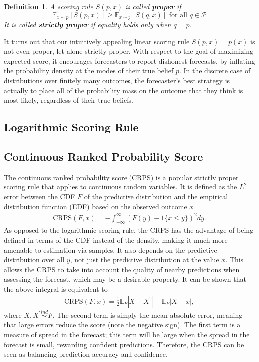 \documentclass[12pt]{article}
\newcommand*{\abs}[1]{\left\lvert#1\right\rvert}
\newcommand{\E}{\mathbb{E}}
\newtheorem{definition}{Definition}
\begin{document}
\begin{definition}
A scoring rule $S(p, x)$ is called \textbf{proper} if 
\[\E_{x \sim p}\left[S(p, x) \right] \geq \E_{x \sim p}\left[S(q, x) \right] \text{ for all } q  \in \mathcal{P}\]
It is called \textbf{strictly proper} if equality holds only when $q = p$. 
\end{definition}

It turns out that our intuitively appealing linear scoring rule $S(p, x) = p(x)$ is not even proper, let alone strictly proper. With respect to the goal of maximizing expected score, it encourages forecasters to report dishonest forecasts, 
by inflating the probability density at the modes of their true belief $p$. In the discrete case of distributions over finitely many outcomes, the forecaster's best strategy is actually to place all of the probability mass on the outcome that 
they think is most likely, regardless of their true beliefs. 

\subsection{Logarithmic Scoring Rule}

\subsection{Continuous Ranked Probability Score}
The continuous ranked probability score (CRPS) is a popular strictly proper scoring rule that applies to continuous random variables. It is defined as the $L^2$ error between the CDF $F$ of the predictive distribution and the 
empirical distribution function (EDF) based on the observed outcome $x$
\begin{align} 
\text{CRPS}(F, x) = -\int_{-\infty}^{\infty} \left(F(y) - 1\{x \leq y\} \right)^2 dy. \label{CRPS}
\end{align}
As opposed to the logarithmic scoring rule, the CRPS has the advantage of being defined in terms of the CDF instead of the density, making it much more amenable to estimation via samples. It also depends on the predictive 
distribution over all $y$, not just the predictive distribution at the value $x$. This allows the CRPS to take into account the quality of nearby predictions when assessing the forecast, which may be a desirable property. It can be 
shown that the above integral is equivalent to 
\begin{align}
\text{CRPS}(F, x) = \frac{1}{2} \E_F \abs{X - X^\prime} - \E_F \abs{X - x}, \label{CRPS2}
\end{align}
where $X, X^\prime \overset{ind}{\sim} F$. The second term is simply the mean absolute error, meaning that large errors reduce the score (note the negative sign). The first term is a measure of spread in the forecast; this term 
will be large when the spread in the forecast is small, rewarding confident predictions. Therefore, the CRPS can be seen as balancing prediction accuracy and confidence. 
\end{document}
